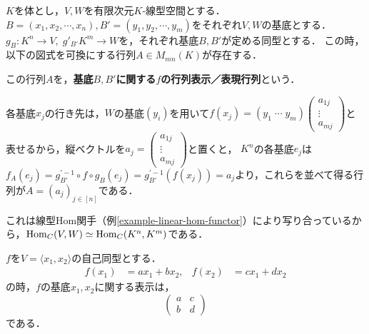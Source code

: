 \documentclass[uplatex, 12pt, dvipdfmx]{jsreport}
\begin{document}
\begin{shadebox}\begin{definition}
    $K$を体とし，$V,W$を有限次元$K$-線型空間とする．$B=(x_1,x_2,\cdots,x_n), B'=(y_1,y_2,\cdots,y_m)$をそれぞれ$V,W$の基底とする．$g_B:K^n\longrightarrow V,\; g'_{B'}K^m\longrightarrow W$を，それぞれ基底$B,B'$が定める同型とする．
    この時，以下の図式を可換にする行列$A\in M_{mn}(K)$が存在する．
    \begin{center}\end{center}
    この行列$A$を，\textbf{基底$B,B'$に関する$f$の行列表示／表現行列}という．

    各基底$x_j$の行き先は，$W$の基底$(y_i)$を用いて$f(x_j)=(y_1\;\cdots\;y_m)\begin{pmatrix}a_{1j}\\\vdots\\a_{mj}\end{pmatrix}$と表せるから，縦ベクトルを$a_j=\begin{pmatrix}a_{1j}\\\vdots\\a_{mj}\end{pmatrix}$と置くと，
    $K^n$の各基底$e_j$は$f_A(e_j)=g^{'-1}_{B'}\circ f\circ g_B(e_j)=g^{'-1}_{B'}(f(x_j))=a_j$より，これらを並べて得る行列が$A=(a_j)_{j\in[n]}$である．

    これは線型Hom関手（例\ref{example-linear-hom-functor}）により写り合っているから，$\mathrm{Hom}_C(V,W)\simeq\mathrm{Hom}_C(K^n,K^m)$である．
\end{definition}\end{shadebox}

\vspace{1mm}

\begin{example}
    $f$を$V=\langle x_1,x_2\rangle$の自己同型とする．
    \begin{align*}
        f(x_1)&=ax_1+bx_2,&f(x_2)&=cx_1+dx_2
    \end{align*}
    の時，$f$の基底$x_1,x_2$に関する表示は，
    \[ \begin{pmatrix}a&c\\b&d\end{pmatrix} \]
    である．
\end{example}
\end{document}
